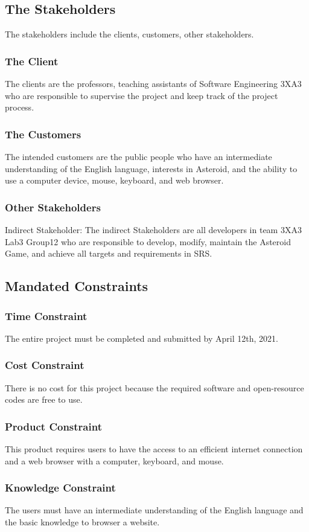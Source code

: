 \documentclass[12pt, titlepage]{article}
\begin{document}
\subsection{The Stakeholders}
The stakeholders include the clients, customers, other stakeholders. 
\subsubsection{The Client}
The clients are the professors, teaching assistants of Software Engineering 3XA3 who are responsible to supervise the project and keep track of the project process. 
\subsubsection{The Customers}
The intended customers are the public people who have an intermediate understanding of the English language, interests in Asteroid, and the ability to use a computer device, mouse, keyboard, and web browser. 
\subsubsection{Other Stakeholders}
Indirect Stakeholder: The indirect Stakeholders are all developers in team 3XA3 Lab3 Group12 who are responsible to develop, modify, maintain the Asteroid Game, and achieve all targets and requirements in SRS.  
\subsection{Mandated Constraints}
\subsubsection{Time Constraint}
The entire project must be completed and submitted by April 12th, 2021. 
\subsubsection{Cost Constraint}
There is no cost for this project because the required software and open-resource codes are free to use. 
\subsubsection{Product Constraint}
This product requires users to have the access to an efficient internet connection and a web browser with a computer, keyboard, and mouse.
\subsubsection{Knowledge Constraint}
The users must have an intermediate understanding of the English language and the basic knowledge to browser a website.
\end{document}
